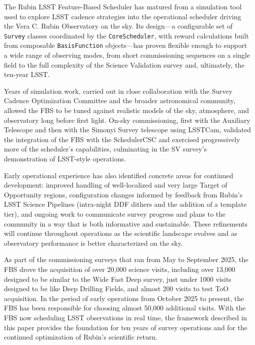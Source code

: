 The Rubin LSST Feature-Based Scheduler has matured from a simulation tool used to explore
LSST cadence strategies into the operational scheduler driving the Vera C.
Rubin Observatory on the sky. Its design---a configurable set of \texttt{Survey}
classes coordinated by the \texttt{CoreScheduler}, with reward calculations
built from composable \texttt{BasisFunction} objects---has proven flexible
enough to support a wide range of observing modes, from short commissioning
sequences on a single field to the full complexity of the Science Validation
survey and, ultimately, the ten-year LSST.

Years of simulation work, carried out in close collaboration with the Survey
Cadence Optimization Committee and the broader astronomical community, allowed
the FBS to be tuned against realistic models of the sky, atmosphere, and
observatory long before first light. On-sky commissioning, first with the
Auxiliary Telescope and then with the Simonyi Survey telescope using LSSTCam, validated
the integration of the FBS with the SchedulerCSC and exercised progressively
more of the scheduler's capabilities, culminating in the SV survey's
demonstration of LSST-style operations.

Early operational experience has also identified concrete areas for continued
development: improved handling of well-localized and very large Target of
Opportunity regions, configuration changes informed by feedback from
Rubin's LSST Science Pipelines (intra-night DDF dithers and the addition of a template
tier), and ongoing work to communicate survey progress and plans to the
community in a way that is both informative and sustainable. These refinements
will continue throughout operations as the scientific landscape evolves and as
observatory performance is better characterized on the sky.

As part of the commissioning surveys that ran from May to September 2025, the FBS 
drove the acquisition of over 20,000 science visits, including over 13,000 designed to be similar to 
the Wide Fast Deep survey, just under 1000 visits designed to be like Deep Drilling Fields, 
and almost 200 visits to test ToO acquisition. In the period of early operations
from October 2025 to present, the FBS has been responsible for choosing almost 50,000 
additional visits.  With the FBS now scheduling LSST observations in real time, the framework
described in this paper provides the foundation for ten years of survey
operations and for the continued optimization of Rubin's scientific return.



